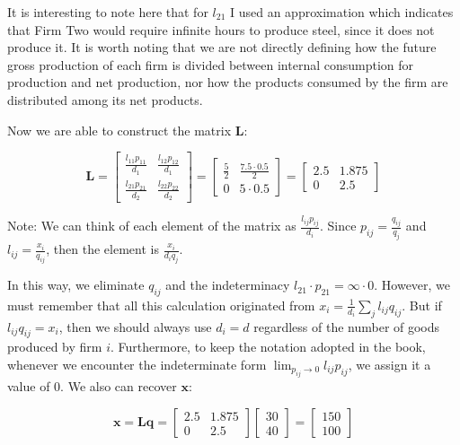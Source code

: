 It is interesting to note here that for $l_{21}$ I used an approximation which indicates that Firm Two would require infinite hours to produce steel, since it does not produce it. It is worth noting that we are not directly defining how the future gross production of each firm is divided between internal consumption for production and net production, nor how the products consumed by the firm are distributed among its net products.

Now we are able to construct the matrix $\boldsymbol{L}$:

\begin{equation}
\boldsymbol{L}=\left[\begin{array}{cc}
\frac{l_{11}p_{11}}{d_{1}} & \frac{l_{12}p_{12}}{d_{1}}\\
\frac{l_{21}p_{21}}{d_{2}} & \frac{l_{22}p_{22}}{d_{2}}
\end{array}\right]=\left[\begin{array}{cc}
\frac{5}{2} & \frac{7.5\cdot0.5}{2}\\
0 & 5\cdot0.5
\end{array}\right]=\left[\begin{array}{cc}
2.5 & 1.875\\
0 & 2.5
\end{array}\right]
\end{equation}


Note: We can think of each element of the matrix as $\frac{l_{ij}p_{ij}}{d_{i}}$. Since $p_{ij}=\frac{q_{ij}}{q_j}$ and $l_{ij}=\frac{x_{i}}{q_{ij}}$, then the element is $\frac{x_{i}}{d_{i}q_{j}}$.

In this way, we eliminate $q_{ij}$ and the indeterminacy $l_{21}\cdot p_{21} = \infty \cdot 0$. However, we must remember that all this calculation originated from $x_{i}=\frac{1}{d_{i}}\sum_{j}l_{ij}q_{ij}$. But if $l_{ij}q_{ij}=x_i$, then we should always use $d_i=d$ regardless of the number of goods produced by firm $i$.  Furthermore, to keep the notation adopted in the book, whenever we encounter the indeterminate form $\lim_{p_{ij}\rightarrow0} l_{ij} p_{ij}$, we assign it a value of $0$. We also can recover $\boldsymbol{x}$:


\begin{equation}
\boldsymbol{x}=\boldsymbol{L}\boldsymbol{q}=\left[\begin{array}{cc}
2.5 & 1.875\\
0 & 2.5
\end{array}\right]\left[\begin{array}{c}
30\\
40
\end{array}\right]=\left[\begin{array}{c}
150\\
100
\end{array}\right]
\end{equation}

